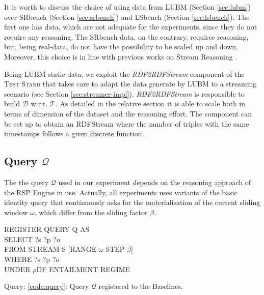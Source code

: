 It is worth to discuss the choice of using data from LUBM (Section \ref{sec:lubm}) over SRbench (Section \ref{sec:srbench}) and LSbench (Section \ref{sec:lsbench}). The first one has data, which are not adequate for the experiments, since they do not require any reasoning. The SRbench data, on the contrary, requires reasoning, but, being real-data, do not have the possibility to be scaled up and down. Moreover, this choice is in line with previous works on Stream Reasoning \cite{DBLP:conf/semweb/UrbaniMJHB13}. 

Being LUBM static data, we exploit the \textit{RDF2RDFStream} component of the \textsc{Test Stand} that takes care to adapt the data generate by LUBM to a streaming scenario (see Section \ref{sec:streamer-impl}). \textit{RDF2RDFStream} is responsible to build $\mathcal{D}$ w.r.t. $\mathcal{T}$. As detailed in the relative section it is able to scale both in terms of dimension of the dataset and the reasoning effort. The component can be set up to obtain an RDFStream where the number of triples with the same timestamps follows a given discrete function. %

\subsection{Query $\mathcal{Q}$}\label{sec:query}
 
The the query $\mathcal{Q}$ used in our experiment depends on the reasoning approach of the RSP Engine in use. Actually, all  experiments uses variants of the basic identity query that continuously asks for the materialisation of the current sliding window $\omega$, which differ from the sliding factor $\beta$.\\

\begin{center}
\raggedright
REGISTER QUERY Q AS \\
SELECT ?s ?p ?o \\
FROM STREAM S [RANGE $\omega$ STEP $\beta$]\\
WHERE {?s ?p ?o}\\
UNDER $\rho$DF ENTAILMENT REGIME
\label{code:query}

\end{center}
Query: \ref{code:query}: Query $\mathcal{Q}$ registered to the \name Baselines.\\


